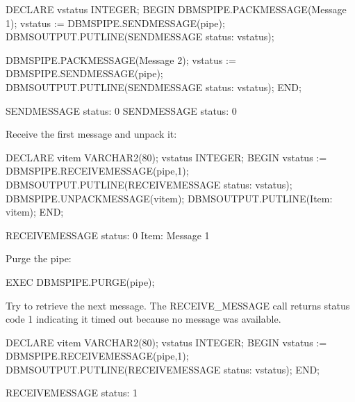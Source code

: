 \documentclass[letterpaper,10pt,english,openany,oneside]{sphinxmanual}
\begin{document}
%
\begin{sphinxVerbatim}[commandchars=\\\{\}]
DECLARE
    v\PYGZus{}status        INTEGER;
BEGIN
    DBMS\PYGZus{}PIPE.PACK\PYGZus{}MESSAGE(\PYGZsq{}Message \PYGZsh{}1\PYGZsq{});
    v\PYGZus{}status := DBMS\PYGZus{}PIPE.SEND\PYGZus{}MESSAGE(\PYGZsq{}pipe\PYGZsq{});
    DBMS\PYGZus{}OUTPUT.PUT\PYGZus{}LINE(\PYGZsq{}SEND\PYGZus{}MESSAGE status: \PYGZsq{} \textbar{}\textbar{} v\PYGZus{}status);

    DBMS\PYGZus{}PIPE.PACK\PYGZus{}MESSAGE(\PYGZsq{}Message \PYGZsh{}2\PYGZsq{});
    v\PYGZus{}status := DBMS\PYGZus{}PIPE.SEND\PYGZus{}MESSAGE(\PYGZsq{}pipe\PYGZsq{});
    DBMS\PYGZus{}OUTPUT.PUT\PYGZus{}LINE(\PYGZsq{}SEND\PYGZus{}MESSAGE status: \PYGZsq{} \textbar{}\textbar{} v\PYGZus{}status);
END;

SEND\PYGZus{}MESSAGE status: 0
SEND\PYGZus{}MESSAGE status: 0
\end{sphinxVerbatim}

Receive the first message and unpack it:

%
\begin{sphinxVerbatim}[commandchars=\\\{\}]
DECLARE
    v\PYGZus{}item          VARCHAR2(80);
    v\PYGZus{}status        INTEGER;
BEGIN
    v\PYGZus{}status := DBMS\PYGZus{}PIPE.RECEIVE\PYGZus{}MESSAGE(\PYGZsq{}pipe\PYGZsq{},1);
    DBMS\PYGZus{}OUTPUT.PUT\PYGZus{}LINE(\PYGZsq{}RECEIVE\PYGZus{}MESSAGE status: \PYGZsq{} \textbar{}\textbar{} v\PYGZus{}status);
    DBMS\PYGZus{}PIPE.UNPACK\PYGZus{}MESSAGE(v\PYGZus{}item);
    DBMS\PYGZus{}OUTPUT.PUT\PYGZus{}LINE(\PYGZsq{}Item: \PYGZsq{} \textbar{}\textbar{} v\PYGZus{}item);
END;

RECEIVE\PYGZus{}MESSAGE status: 0
Item: Message \PYGZsh{}1
\end{sphinxVerbatim}

Purge the pipe:

%
\begin{sphinxVerbatim}[commandchars=\\\{\}]
EXEC DBMS\PYGZus{}PIPE.PURGE(\PYGZsq{}pipe\PYGZsq{});
\end{sphinxVerbatim}

\newpage

Try to retrieve the next message. The RECEIVE\_MESSAGE call returns status code 1 indicating it timed out because no message was available.

%
\begin{sphinxVerbatim}[commandchars=\\\{\}]
DECLARE
    v\PYGZus{}item          VARCHAR2(80);
    v\PYGZus{}status        INTEGER;
BEGIN
    v\PYGZus{}status := DBMS\PYGZus{}PIPE.RECEIVE\PYGZus{}MESSAGE(\PYGZsq{}pipe\PYGZsq{},1);
    DBMS\PYGZus{}OUTPUT.PUT\PYGZus{}LINE(\PYGZsq{}RECEIVE\PYGZus{}MESSAGE status: \PYGZsq{} \textbar{}\textbar{} v\PYGZus{}status);
END;

RECEIVE\PYGZus{}MESSAGE status: 1
\end{sphinxVerbatim}
\end{document}
